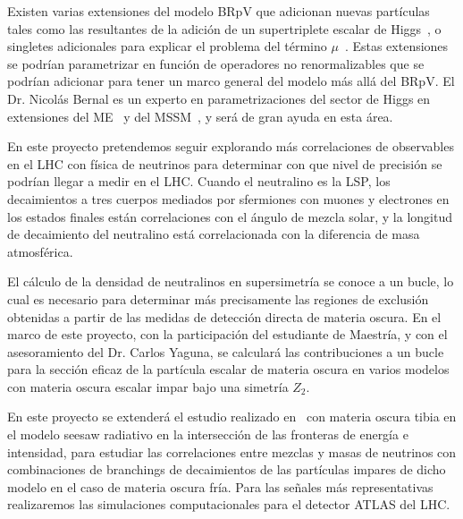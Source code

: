 \begin{bbrpvlhc}
  Existen varias extensiones del modelo BRpV que adicionan nuevas
  partículas tales como las resultantes de la adición de un
  supertriplete escalar de Higgs~\cite{AristizabalSierra:2003ix}, o
  singletes adicionales para explicar el problema del término
  $\mu$~\cite{LopezFogliani:2005yw}. Estas extensiones se podrían
  parametrizar en función de operadores no renormalizables que se
  podrían adicionar para tener un marco general del modelo más allá
  del BRpV. El Dr. Nicolás Bernal es un experto en parametrizaciones
  del sector de Higgs en extensiones del ME~\cite{Bernal:2009rk,LopezVal:2010vk} y del MSSM~\cite{Bernal:2007uv,Bernal:2009hd}, 
  y será de gran ayuda en
  esta área.
\end{bbrpvlhc}

\begin{brpvlhc}
  En este proyecto pretendemos seguir explorando más correlaciones
  de observables en el LHC con física de neutrinos para determinar con
  que nivel de precisión se podrían llegar a medir en el LHC. Cuando
  el neutralino es la LSP, los decaimientos a tres cuerpos mediados
  por sfermiones con muones y electrones en los estados finales están
  correlaciones con el ángulo de mezcla solar, y la longitud de
  decaimiento del neutralino está correlacionada con la diferencia de
  masa atmosférica.
\end{brpvlhc}


\begin{darkmatter}
  El cálculo de la densidad de neutralinos en supersimetría se conoce
  a un bucle, lo cual es necesario para determinar más precisamente las
  regiones de exclusión obtenidas a partir de las medidas de detección
  directa de materia oscura. En el marco de este proyecto,
  con la participación del estudiante de Maestría, y con el
  asesoramiento del Dr. Carlos Yaguna, se 
  calculará las contribuciones a un bucle  para la sección eficaz de la
  partícula escalar de materia oscura en varios  modelos con materia oscura
  escalar impar bajo una simetría $Z_2$.

  En este proyecto se extenderá el estudio realizado
  en~\cite{Sierra:2008wj} con materia oscura tibia en el modelo seesaw
  radiativo en la intersección de las fronteras de energía e
  intensidad, para estudiar las correlaciones entre mezclas y masas de
  neutrinos con combinaciones de branchings de decaimientos de las
  partículas impares de dicho modelo en el caso de materia oscura
  fría. Para las señales más representativas realizaremos las
  simulaciones computacionales para el detector ATLAS del LHC.
\end{darkmatter}



